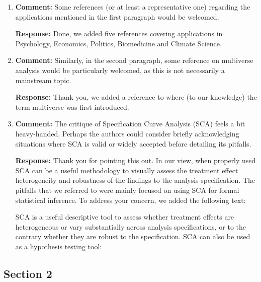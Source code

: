 \documentclass[11pt, a4paper]{article}
\newcommand{\reply}{\vspace{0.3cm} \noindent \textbf{Response:} {\it }}
\begin{document}
\begin{enumerate}[leftmargin=*]

\item \textbf{Comment:} Some references (or at least a representative one) regarding the applications mentioned in the first paragraph would be welcomed.

\reply Done, we added five references covering applications in Psychology, Economics, Politics, Biomedicine and Climate Science.


\vspace{0.5cm}



\item \textbf{Comment:} Similarly, in the second paragraph, some reference on multiverse analysis would be particularly welcomed, as this is not necessarily a mainstream topic.

\reply Thank you, we added a reference to \cite{steegen:2016} where (to our knowledge) the term multiverse was first introduced.


\vspace{0.5cm}


\item \textbf{Comment:} The critique of Specification Curve Analysis (SCA) feels a bit heavy-handed. Perhaps the authors could consider briefly acknowledging situations where SCA is valid or widely accepted before detailing its pitfalls.

\reply Thank you for pointing this out. In our view, when properly used SCA can be a useful methodology to visually assess the treatment effect heterogeneity and robustness of the findings to the analysis specification. The pitfalls that we referred to were mainly focused on using SCA for formal statistical inference. To address your concern, we added the following text:

\color{blue} SCA is a useful descriptive tool to assess whether treatment effects are heterogeneous or vary substantially across analysis specifications, or to the contrary whether they are robust to the specification. SCA can also be used as a hypothesis testing tool: \color{black}


\end{enumerate}


\subsection*{Section 2}
\end{document}
